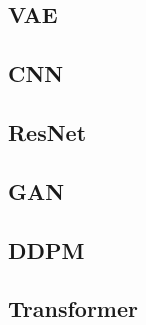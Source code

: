 \documentclass{myclass}
\begin{document}
\subsection{VAE}
\subsection{CNN}
\subsection{ResNet}
\subsection{GAN}
\subsection{DDPM}
\subsection{Transformer}


\end{document}
